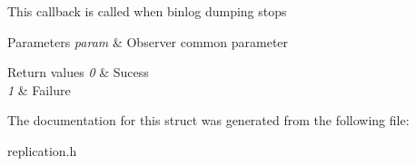 This callback is called when binlog dumping stops


\begin{DoxyParams}{Parameters}
{\em param} & Observer common parameter\\
\hline
\end{DoxyParams}

\begin{DoxyRetVals}{Return values}
{\em 0} & Sucess \\
\hline
{\em 1} & Failure \\
\hline
\end{DoxyRetVals}


The documentation for this struct was generated from the following file\+:\begin{DoxyCompactItemize}
\item 
replication.\+h\end{DoxyCompactItemize}
